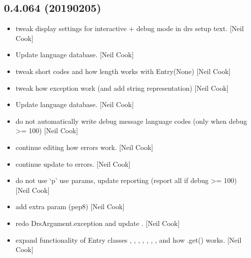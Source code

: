 \documentclass[a4paper,10pt,english]{report}
\begin{document}
\subsection{0.4.064 (2019\sphinxhyphen{}02\sphinxhyphen{}05)}
\label{\detokenize{misc/changelog:id213}}\begin{itemize}
\item {} 
 \sphinxhyphen{} tweak display settings for interactive + debug mode
in drs setup text. {[}Neil Cook{]}

\item {} 
Update language database. {[}Neil Cook{]}

\item {} 
 \sphinxhyphen{} tweak short codes and how length works with Entry(None)
{[}Neil Cook{]}

\item {} 
 \sphinxhyphen{} tweak how exception work (and add string
representation) {[}Neil Cook{]}

\item {} 
Update language database. {[}Neil Cook{]}

\item {} 
 \sphinxhyphen{} do not automatically write debug message language
codes (only when debug \textgreater{}= 100) {[}Neil Cook{]}

\item {} 
 \sphinxhyphen{} continue editing how errors work. {[}Neil Cook{]}

\item {} 
 \sphinxhyphen{} continue update to errors. {[}Neil Cook{]}

\item {} 
 \sphinxhyphen{} do not use ‘p’ use params, update reporting (report all
if debug \textgreater{}= 100) {[}Neil Cook{]}

\item {} 
 \sphinxhyphen{} add extra param (pep8) {[}Neil Cook{]}

\item {} 
 \sphinxhyphen{} redo DrsArgument.exception and update .
{[}Neil Cook{]}

\item {} 
 \sphinxhyphen{} expand functionality of Entry classes ,
, , , , , , 
and how .get() works. {[}Neil Cook{]}


\end{itemize}
\end{document}

